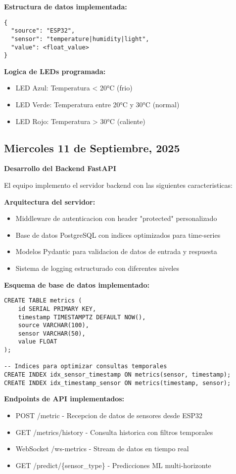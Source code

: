 \documentclass[11pt,letterpaper]{article}
\begin{document}
\textbf{Estructura de datos implementada:}
\begin{verbatim}
{
  "source": "ESP32",
  "sensor": "temperature|humidity|light",
  "value": <float_value>
}
\end{verbatim}

\textbf{Logica de LEDs programada:}
\begin{itemize}
    \item LED Azul: Temperatura < 20°C (frio)
    \item LED Verde: Temperatura entre 20°C y 30°C (normal)
    \item LED Rojo: Temperatura > 30°C (caliente)
\end{itemize}

\subsection{Miercoles 11 de Septiembre, 2025}
\textbf{Desarrollo del Backend FastAPI}

El equipo implemento el servidor backend con las siguientes caracteristicas:

\textbf{Arquitectura del servidor:}
\begin{itemize}
    \item Middleware de autenticacion con header "protected" personalizado
    \item Base de datos PostgreSQL con indices optimizados para time-series
    \item Modelos Pydantic para validacion de datos de entrada y respuesta
    \item Sistema de logging estructurado con diferentes niveles
\end{itemize}

\textbf{Esquema de base de datos implementado:}
\begin{verbatim}
CREATE TABLE metrics (
    id SERIAL PRIMARY KEY,
    timestamp TIMESTAMPTZ DEFAULT NOW(),
    source VARCHAR(100),
    sensor VARCHAR(50),
    value FLOAT
);

-- Indices para optimizar consultas temporales
CREATE INDEX idx_sensor_timestamp ON metrics(sensor, timestamp);
CREATE INDEX idx_timestamp_sensor ON metrics(timestamp, sensor);
\end{verbatim}

\textbf{Endpoints de API implementados:}
\begin{itemize}
    \item POST /metric - Recepcion de datos de sensores desde ESP32
    \item GET /metrics/history - Consulta historica con filtros temporales
    \item WebSocket /ws-metrics - Stream de datos en tiempo real
    \item GET /predict/\{sensor\_type\} - Predicciones ML multi-horizonte
\end{itemize}
\end{document}
